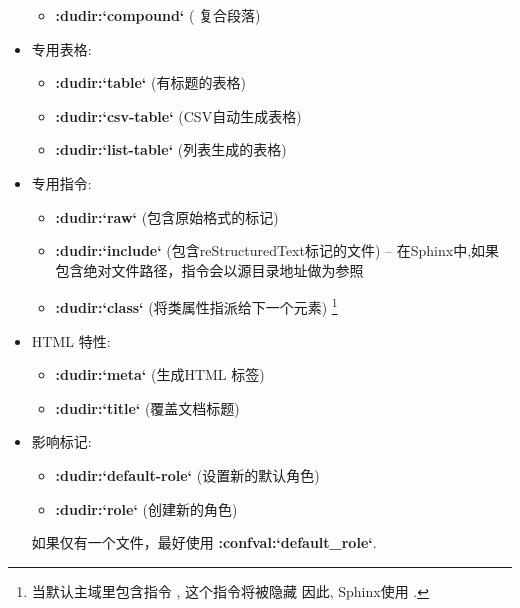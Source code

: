 \documentclass[letterpaper,10pt,english]{sphinxmanual}
\begin{document}
\begin{itemize}
\begin{itemize}
\item {} 
{\color{red}\bfseries{}:dudir:{}`compound{}`} ( 复合段落)

\end{itemize}

\item {} 
专用表格:
\begin{itemize}
\item {} 
{\color{red}\bfseries{}:dudir:{}`table{}`} (有标题的表格)

\item {} 
{\color{red}\bfseries{}:dudir:{}`csv-table{}`} (CSV自动生成表格)

\item {} 
{\color{red}\bfseries{}:dudir:{}`list-table{}`} (列表生成的表格)

\end{itemize}

\item {} 
专用指令:
\begin{itemize}
\item {} 
{\color{red}\bfseries{}:dudir:{}`raw{}`} (包含原始格式的标记)

\item {} 
{\color{red}\bfseries{}:dudir:{}`include{}`} (包含reStructuredText标记的文件)
-- 在Sphinx中,如果包含绝对文件路径，指令会以源目录地址做为参照

\item {} 
{\color{red}\bfseries{}:dudir:{}`class{}`} (将类属性指派给下一个元素) \footnote[1]{\sphinxAtStartFootnote%
当默认主域里包含指令  , 这个指令将被隐藏
因此, Sphinx使用 .
}

\end{itemize}

\item {} 
HTML 特性:
\begin{itemize}
\item {} 
{\color{red}\bfseries{}:dudir:{}`meta{}`} (生成HTML  标签)

\item {} 
{\color{red}\bfseries{}:dudir:{}`title{}`} (覆盖文档标题)

\end{itemize}

\item {} 
影响标记:
\begin{itemize}
\item {} 
{\color{red}\bfseries{}:dudir:{}`default-role{}`} (设置新的默认角色)

\item {} 
{\color{red}\bfseries{}:dudir:{}`role{}`} (创建新的角色)

\end{itemize}

如果仅有一个文件，最好使用 {\color{red}\bfseries{}:confval:{}`default\_role{}`}.

\end{itemize}
\end{document}
